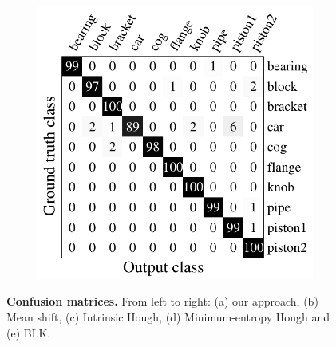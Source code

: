 \begin{figure}[ht]
\begin{subfigure}[t]{0.40\linewidth}
	\end{subfigure}
	\begin{subfigure}[t]{0.40\linewidth}
		\label{fig/reg/confusion_blk}
		\includegraphics[width=1\linewidth]{fig/reg/confusion_blk.pdf}
	\end{subfigure}
	\caption{\textbf{Confusion matrices.} From left to right: (a) our approach, (b) Mean shift, (c) Intrinsic Hough, (d) Minimum-entropy Hough and (e) BLK.}
	\label{fig/reg/recresult3d}
\end{figure}




